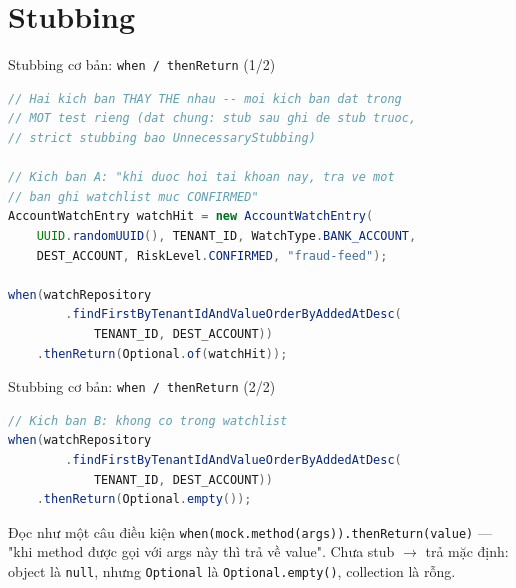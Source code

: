 \documentclass[aspectratio=169,12pt]{beamer}
\begin{document}
\section{Stubbing}

\begin{frame}[fragile]{Stubbing cơ bản: \texttt{when / thenReturn} (1/2)}
\begin{lstlisting}[language=java,basicstyle=\ttfamily\scriptsize]
// Hai kich ban THAY THE nhau -- moi kich ban dat trong
// MOT test rieng (dat chung: stub sau ghi de stub truoc,
// strict stubbing bao UnnecessaryStubbing)

// Kich ban A: "khi duoc hoi tai khoan nay, tra ve mot
// ban ghi watchlist muc CONFIRMED"
AccountWatchEntry watchHit = new AccountWatchEntry(
    UUID.randomUUID(), TENANT_ID, WatchType.BANK_ACCOUNT,
    DEST_ACCOUNT, RiskLevel.CONFIRMED, "fraud-feed");

when(watchRepository
        .findFirstByTenantIdAndValueOrderByAddedAtDesc(
            TENANT_ID, DEST_ACCOUNT))
    .thenReturn(Optional.of(watchHit));
\end{lstlisting}
\end{frame}

\begin{frame}[fragile]{Stubbing cơ bản: \texttt{when / thenReturn} (2/2)}
\begin{lstlisting}[language=java,basicstyle=\ttfamily\scriptsize]
// Kich ban B: khong co trong watchlist
when(watchRepository
        .findFirstByTenantIdAndValueOrderByAddedAtDesc(
            TENANT_ID, DEST_ACCOUNT))
    .thenReturn(Optional.empty());
\end{lstlisting}

  \begin{block}{Đọc như một câu điều kiện}
    \texttt{when(mock.method(args)).thenReturn(value)} ---
    "khi method được gọi với args này thì trả về value".
    Chưa stub $\to$ trả mặc định: object là \texttt{null}, nhưng
    \texttt{Optional} là \texttt{Optional.empty()}, collection là rỗng.
  \end{block}
\end{frame}
\end{document}
